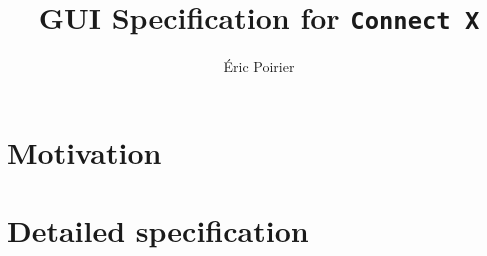 \documentclass{report}
\newcommand{\files}{./files/}
\begin{document}
\title{GUI Specification for \texttt{Connect X}}
\author{Éric Poirier}
\maketitle



\chapter{Motivation}



\chapter{Detailed specification}



%
%
\end{document}
